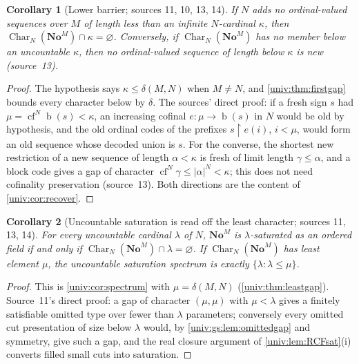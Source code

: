 \documentclass[11pt,letterpaper]{article}
\numberwithin{equation}{section}
\newtheorem{corollary}[corollary]{Corollary}
\theoremstyle{definition}
\theoremstyle{remark}
\newcommand{\No}{\mathbf{No}}
\newcommand{\NoM}{\No^{M}}
\newcommand{\bd}{\operatorname{b}}
\newcommand{\cf}{\operatorname{cf}}
\newcommand{\res}{\mathbin{\upharpoonright}}
\newcommand{\abs}[1]{\lvert#1\rvert}
\newcommand{\Char}{\operatorname{Char}}
\begin{document}
\begin{corollary}[Lower barrier; sources 11, 10, 13, 14]\label{univ:gs:cor:lowerbarrier}
If $N$ adds no ordinal-valued sequences over $M$ of length less than an infinite
$N$-cardinal $\kappa$, then $\Char_N(\NoM)\cap\kappa=\varnothing$.
Conversely, if $\Char_N(\NoM)$ has no member below an uncountable $\kappa$, then no
ordinal-valued sequence of length below $\kappa$ is new (source~13).
\end{corollary}
\begin{proof}
The hypothesis says $\kappa\le\delta(M,N)$ when $M\ne N$, and
\cref{univ:thm:firstgap} bounds every character below by $\delta$. The sources'
direct proof: if a fresh sign $s$ had $\mu=\cf^N\bd(s)<\kappa$, an increasing
cofinal $e:\mu\to\bd(s)$ in $N$ would be old by hypothesis, and the old ordinal
codes of the prefixes $s\res e(i)$, $i<\mu$, would form an old sequence whose
decoded union is $s$. For the converse, the shortest new restriction of a new
sequence of length $\alpha<\kappa$ is fresh of limit length $\gamma\le\alpha$, and a
block code gives a gap of character $\cf^N\gamma\le\abs\alpha^N<\kappa$; this does
not need cofinality preservation (source~13). Both directions are the content of
\cref{univ:cor:recover}.
\end{proof}

\begin{corollary}[Uncountable saturation is read off the least character; sources 11, 13, 14]\label{univ:gs:cor:saturation}
For every uncountable cardinal $\lambda$ of $N$, $\NoM$ is $\lambda$-saturated as
an ordered field if and only if $\Char_N(\NoM)\cap\lambda=\varnothing$. If
$\Char_N(\NoM)$ has least element $\mu$, the uncountable saturation spectrum is
exactly $\{\lambda:\lambda\le\mu\}$.
\end{corollary}
\begin{proof}
This is \cref{univ:cor:spectrum} with $\mu=\delta(M,N)$ (\cref{univ:thm:leastgap}).
Source~11's direct proof: a gap of character $(\mu,\mu)$ with $\mu<\lambda$ gives a
finitely satisfiable omitted type over fewer than $\lambda$ parameters; conversely
every omitted cut presentation of size below $\lambda$ would, by
\cref{univ:gs:lem:omittedgap} and symmetry, give such a gap, and the real closure
argument of \cref{univ:lem:RCFsat}(i) converts filled small cuts into saturation.
\end{proof}
\end{document}
